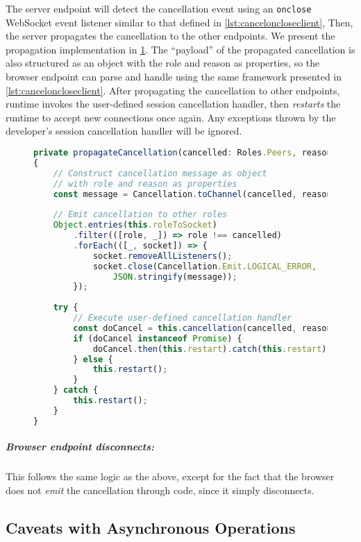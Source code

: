 The server endpoint will detect the cancellation event
using an \texttt{onclose} WebSocket event listener
similar to that defined in \cref{lst:canceloncloseclient},
Then, the server propagates the cancellation
to the other endpoints.
We present the propagation implementation
in \cref{lst:cancelpropagate}.
The ``payload'' of the propagated cancellation is also structured
as an object with the role and reason as properties,
so the browser endpoint can parse and handle using
the same framework presented in \cref{lst:canceloncloseclient}.
After propagating the cancellation to other endpoints,
runtime invokes the user-defined session cancellation
handler, then \textit{restarts} the runtime to accept
new connections once again. 
Any exceptions thrown by the developer's session cancellation
handler will be ignored.

\begin{figure}[!h]
\begin{lstlisting}[language=javascript,tabsize=2]
private propagateCancellation(cancelled: Roles.Peers, reason?: any)
{
	// Construct cancellation message as object
	// with role and reason as properties
	const message = Cancellation.toChannel(cancelled, reason);
	
	// Emit cancellation to other roles
	Object.entries(this.roleToSocket)
		.filter(([role, _]) => role !== cancelled)
		.forEach(([_, socket]) => {
			socket.removeAllListeners();
			socket.close(Cancellation.Emit.LOGICAL_ERROR,
				JSON.stringify(message));
		});
	
	try {
		// Execute user-defined cancellation handler
		const doCancel = this.cancellation(cancelled, reason);
		if (doCancel instanceof Promise) {
			doCancel.then(this.restart).catch(this.restart);		
		} else {
			this.restart();
		}
	} catch {
		this.restart();
	}
}
\end{lstlisting}
\label{lst:cancelpropagate}
\end{figure}

\subparagraph{Browser endpoint disconnects:}
This follows the same logic as the above,
except for the fact that the browser does not
\textit{emit} the cancellation through code, since
it simply disconnects.

\subsection{Caveats with Asynchronous Operations}
\label{subsection:errorasync}

